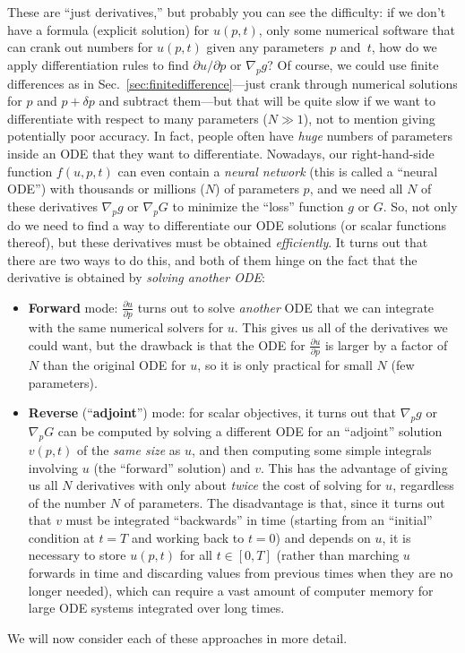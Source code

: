 These are ``just derivatives,'' but probably you can see the difficulty:
if we don't have a formula (explicit solution) for $u(p,t)$, only
some numerical software that can crank out numbers for $u(p,t)$ given
any parameters~$p$ and~$t$, how do we apply differentiation rules to find $\partial u/\partial p$
or $\nabla_{p}g$? Of course, we could use finite differences as in Sec.~\ref{sec:finitedifference}---just
crank through numerical solutions for $p$ and $p+\delta p$ and subtract
them---but that will be quite slow if we want to differentiate with
respect to many parameters ($N\gg1$), not to mention giving potentially
poor accuracy. In fact, people often have \emph{huge} numbers of parameters
inside an ODE that they want to differentiate. Nowadays, our right-hand-side
function $f(u,p,t)$ can even contain a \emph{neural network} (this
is called a ``neural ODE'') with thousands or millions ($N$) of
parameters $p$, and we need all $N$ of these derivatives $\nabla_{p}g$
or $\nabla_{p}G$ to minimize the ``loss'' function $g$ or $G$.
So, not only do we need to find a way to differentiate our ODE solutions
(or scalar functions thereof), but these derivatives must be obtained
\emph{efficiently}. It turns out that there are two ways to do this,
and both of them hinge on the fact that the derivative is obtained
by \emph{solving another ODE}:
\begin{itemize}
\item \textbf{Forward} mode: $\frac{\partial u}{\partial p}$ turns out
to solve \emph{another} ODE that we can integrate with the same numerical
solvers for $u$. This gives us all of the derivatives we could want,
but the drawback is that the ODE for $\frac{\partial u}{\partial p}$
is larger by a factor of $N$ than the original ODE for $u$, so it
is only practical for small $N$ (few parameters).
\item \textbf{Reverse} (``\textbf{adjoint}'') mode: for scalar objectives,
it turns out that $\nabla_{p}g$ or $\nabla_{p}G$ can be computed
by solving a different ODE for an ``adjoint'' solution $v(p,t)$
of the \emph{same size} as $u$, and then computing some simple integrals
involving $u$ (the ``forward'' solution) and $v$.
This has the advantage of giving us all $N$ derivatives with only
about \emph{twice} the cost of solving for $u$, regardless of the
number $N$ of parameters. The disadvantage is that, since it turns
out that $v$ must be integrated ``backwards'' in time (starting
from an ``initial'' condition at $t=T$ and working back to $t=0$)
and depends on $u$, it is necessary to store $u(p,t)$ for all $t\in[0,T]$
(rather than marching $u$ forwards in time and discarding values
from previous times when they are no longer needed), which can require
a vast amount of computer memory for large ODE systems integrated
over long times.
\end{itemize}
We will now consider each of these approaches in more detail.

